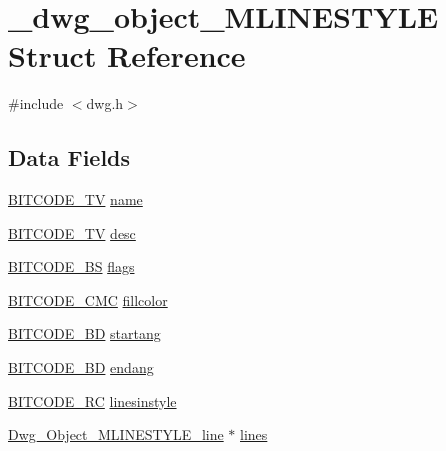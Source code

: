 \hypertarget{struct__dwg__object__MLINESTYLE}{\section{\-\_\-dwg\-\_\-object\-\_\-\-M\-L\-I\-N\-E\-S\-T\-Y\-L\-E \-Struct \-Reference}
\label{struct__dwg__object__MLINESTYLE}
}


{\ttfamily \#include $<$dwg.\-h$>$}

\subsection*{\-Data \-Fields}
\begin{DoxyCompactItemize}
\item 
\hyperlink{dwg_8h_a2a7e040c6e36ca039b03608679ecaf7c}{\-B\-I\-T\-C\-O\-D\-E\-\_\-\-T\-V} \hyperlink{struct__dwg__object__MLINESTYLE_ad440aecaae92874e799dc3c956aef56b}{name}
\item 
\hyperlink{dwg_8h_a2a7e040c6e36ca039b03608679ecaf7c}{\-B\-I\-T\-C\-O\-D\-E\-\_\-\-T\-V} \hyperlink{struct__dwg__object__MLINESTYLE_af97df064815b1ae0bc93c90c07336e67}{desc}
\item 
\hyperlink{dwg_8h_a94297606fbd4a4ff97e8add284af0809}{\-B\-I\-T\-C\-O\-D\-E\-\_\-\-B\-S} \hyperlink{struct__dwg__object__MLINESTYLE_ab2add6f1d78d66c231685d12b6c5e649}{flags}
\item 
\hyperlink{dwg_8h_add86ce54dd5e62c8f7f5a870b467919a}{\-B\-I\-T\-C\-O\-D\-E\-\_\-\-C\-M\-C} \hyperlink{struct__dwg__object__MLINESTYLE_ad18bf9d7c90d166dbb26b55d87330586}{fillcolor}
\item 
\hyperlink{dwg_8h_a3c1e6781466b74ba07785d57da70ed97}{\-B\-I\-T\-C\-O\-D\-E\-\_\-\-B\-D} \hyperlink{struct__dwg__object__MLINESTYLE_ab6b37e797cf756e3355886a7ed436fdd}{startang}
\item 
\hyperlink{dwg_8h_a3c1e6781466b74ba07785d57da70ed97}{\-B\-I\-T\-C\-O\-D\-E\-\_\-\-B\-D} \hyperlink{struct__dwg__object__MLINESTYLE_ae62edc9928737645c9fd9b3f26e1396a}{endang}
\item 
\hyperlink{dwg_8h_a7fd199a8f9c9cc52bdab220f65a2a619}{\-B\-I\-T\-C\-O\-D\-E\-\_\-\-R\-C} \hyperlink{struct__dwg__object__MLINESTYLE_aa4c716f123213e1977eb62b61d91537c}{linesinstyle}
\item 
\hyperlink{dwg_8h_afe05e96bd67abd68ee1a6e26a314372c}{\-Dwg\-\_\-\-Object\-\_\-\-M\-L\-I\-N\-E\-S\-T\-Y\-L\-E\-\_\-line} $\ast$ \hyperlink{struct__dwg__object__MLINESTYLE_a5095967f3914c06bd2c99f7756dcef2b}{lines}

\end{DoxyCompactItemize}
